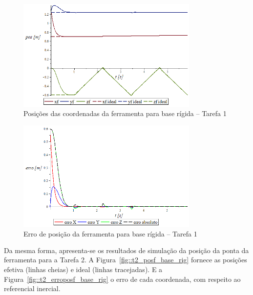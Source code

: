 \begin{figure}[h!]
	\centering 
 	\includegraphics[width=0.80\textwidth]{figs/t1_posf_base_rig}
 	\caption{Posições das coordenadas da ferramenta para base rígida -- Tarefa 1}
 	\label{fig::t1_posf_base_rig}
\end{figure}

\begin{figure}[h!]
	\centering 
 	\includegraphics[width=0.80\textwidth]{figs/t1_erroposf_base_rig}
 	\caption{Erro de posição da ferramenta para base rígida -- Tarefa 1}
 	\label{fig::t1_erroposf_base_rig}
\end{figure}

Da mesma forma, apresenta-se os resultados de simulação da posição da ponta da
ferramenta para a Tarefa 2. A Figura~\ref{fig::t2_posf_base_rig} fornece as
posições efetiva (linhas cheias) e ideal (linhas tracejadas). E a
Figura~\ref{fig::t2_erroposf_base_rig} o erro de cada coordenada, com respeito
ao referencial inercial.

